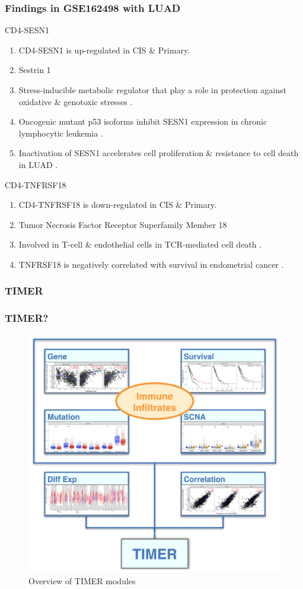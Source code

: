 \documentclass{beamer}
\begin{document}
    \begin{frame}[allowframebreaks]
        \frametitle{Findings in GSE162498 with LUAD}

        \begin{block}{CD4-SESN1}
            \begin{enumerate}
                \item CD4-SESN1 is up-regulated in CIS \& Primary.
                \item Sestrin 1
                \item Stress-inducible metabolic regulator that play a role in protection against oxidative \& genotoxic stresses \cite{SESN1-1, SESN1-2, SESN1-3}.
                \item Oncogenic mutant p53 isoforms inhibit SESN1 expression in chronic lymphocytic leukemia \cite{SESN1-4}.
                \item Inactivation of SESN1 accelerates cell proliferation \& resistance to cell death in LUAD \cite{SESN1-5}.
            \end{enumerate}
        \end{block}

         \begin{block}{CD4-TNFRSF18}
            \begin{enumerate}
                \item CD4-TNFRSF18 is down-regulated in CIS \& Primary.
                \item Tumor Necrosis Factor Receptor Superfamily Member 18
                \item Involved in T-cell \& endothelial cells in TCR-mediated cell death \cite{TNFRSF18-1}.
                \item TNFRSF18 is negatively correlated with survival in endometrial cancer \cite{TNFRSF18-2}.
            \end{enumerate}
        \end{block}
    \end{frame}

    \subsubsection{TIMER}
    \begin{frame}
        \frametitle{TIMER?}

        \begin{figure}
            \includegraphics[width=0.5 \linewidth]{figures/Workflow/TIMER.jpg}
            \caption{Overview of TIMER modules \protect\cite{TIMER-1}}
        \end{figure}
    \end{frame}
\end{document}
